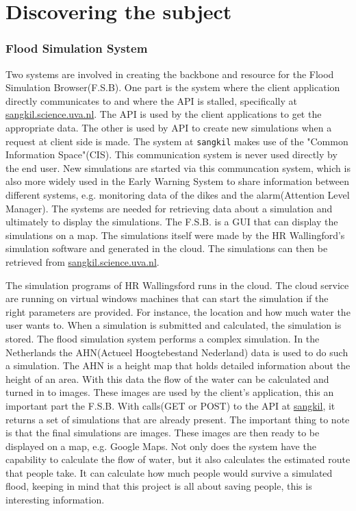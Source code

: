 \part{Discovering the subject}
\label{part:Discovering}
\section{Flood Simulation System}
Two systems are involved in creating the backbone and resource for the Flood Simulation Browser(F.S.B). One part is the system where the client application directly communicates to and where the API is stalled, specifically at \url{sangkil.science.uva.nl}. The API is used by the client applications to get the appropriate data. The other is used by API to create new simulations when a request at client side is made. The system at \texttt{sangkil} makes use of the "Common Information Space"(CIS)\cite{CIS}. This communication system is never used directly by the end user. New simulations are started via this communcation system, which is also more widely used in the Early Warning System to share information between different systems, e.g. monitoring data of the dikes and the alarm(Attention Level Manager). The systems are needed for retrieving data about a simulation and ultimately to display the simulations. The F.S.B. is a GUI\cite{GUI} that can display the simulations on a map. The simulations itself were made by the HR Wallingford's\cite{wallingford} simulation software and generated in the cloud\cite{cloud}. The simulations can then be retrieved from \url{sangkil.science.uva.nl}. 

The simulation programs of HR Wallingsford runs in the cloud. The cloud service are running on virtual windows machines that can start the simulation if the right parameters are provided. For instance, the location and how much water the user wants to. When a simulation is submitted and calculated, the simulation is stored. The flood simulation system performs a complex simulation. In the Netherlands the AHN(Actueel Hoogtebestand Nederland) \cite{AHN} data is used to do such a simulation. The AHN is a height map that holds detailed information about the height of an area. With this data the flow of the water can be calculated and turned in to images. These images are used by the client's application, this an important part the F.S.B. With calls(GET or POST) to the API at \url{sangkil}, it returns a set of simulations that are already present. The important thing to note is that the final simulations are images. These images are then ready to be displayed on a map, e.g. Google Maps. 
Not only does the system have the capability to calculate the flow of water, but it also calculates the estimated route that people take. It can calculate how much people would survive a simulated flood, keeping in mind that this project is all about saving people, this is interesting information.
 
